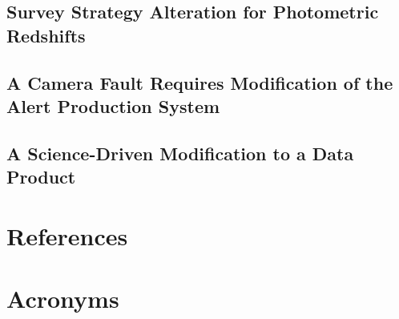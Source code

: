\documentclass[DM,lsstdraft,authoryear,toc]{lsstdoc}
\begin{document}
\clearpage
\subsection{Survey Strategy Alteration for Photometric Redshifts}

\clearpage
\subsection{A Camera Fault Requires Modification of the Alert Production System}

\clearpage
\subsection{A Science-Driven Modification to a Data Product}

\appendix
\section{References} \label{sec:bib}
\renewcommand{\refname}{} %


\section{Acronyms} \label{sec:acronyms}

\end{document}

